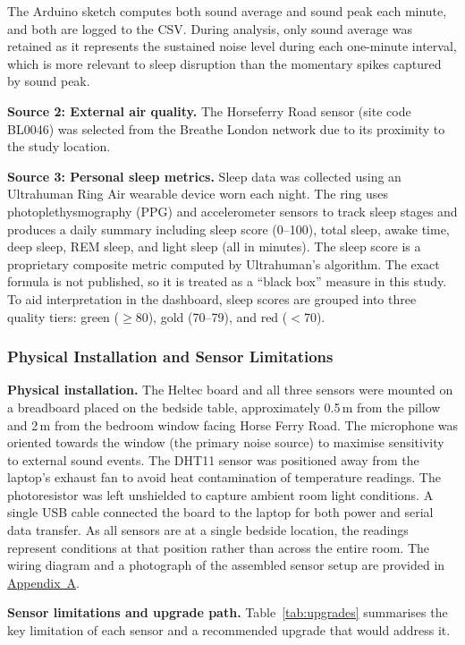 \documentclass[10pt,a4paper]{extarticle}
\begin{document}
The Arduino sketch computes both sound average and sound peak each minute, and both are logged to the CSV. During analysis, only sound average was retained as it represents the sustained noise level during each one-minute interval, which is more relevant to sleep disruption than the momentary spikes captured by sound peak.

\textbf{Source 2: External air quality.} The Horseferry Road sensor (site code BL0046) was selected from the Breathe London network \citep{breathelondon} due to its proximity to the study location.

\textbf{Source 3: Personal sleep metrics.} Sleep data was collected using an Ultrahuman Ring Air wearable device \citep{ultrahuman} worn each night. The ring uses photoplethysmography (PPG) and accelerometer sensors to track sleep stages and produces a daily summary including sleep score (0--100), total sleep, awake time, deep sleep, REM sleep, and light sleep (all in minutes). The sleep score is a proprietary composite metric computed by Ultrahuman's algorithm. The exact formula is not published, so it is treated as a ``black box'' measure in this study. To aid interpretation in the dashboard, sleep scores are grouped into three quality tiers: green ($\geq$80), gold (70--79), and red ($<$70).

\subsubsection{Physical Installation and Sensor Limitations}

\textbf{Physical installation.} The Heltec board and all three sensors were mounted on a breadboard placed on the bedside table, approximately 0.5\,m from the pillow and 2\,m from the bedroom window facing Horse Ferry Road. The microphone was oriented towards the window (the primary noise source) to maximise sensitivity to external sound events. The DHT11 sensor was positioned away from the laptop's exhaust fan to avoid heat contamination of temperature readings. The photoresistor was left unshielded to capture ambient room light conditions. A single USB cable connected the board to the laptop for both power and serial data transfer. As all sensors are at a single bedside location, the readings represent conditions at that position rather than across the entire room. The wiring diagram and a photograph of the assembled sensor setup are provided in \hyperref[app:A]{Appendix~A}.

\textbf{Sensor limitations and upgrade path.} Table~\ref{tab:upgrades} summarises the key limitation of each sensor and a recommended upgrade that would address it.
\end{document}
